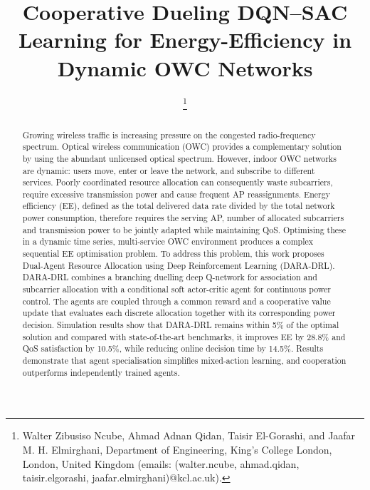 \documentclass[journal]{IEEEtran}
\begin{document}
\title{Cooperative Dueling DQN–SAC Learning for Energy-Efficiency in Dynamic OWC Networks
}

\author{

\thanks{Walter Zibusiso Ncube,
    Ahmad Adnan Qidan, Taisir El-Gorashi,
    and Jaafar M. H. Elmirghani, Department of Engineering, King’s College London, London, United Kingdom (emails: (walter.ncube, ahmad.qidan, taisir.elgorashi, jaafar.elmirghani)@kcl.ac.uk).}
}
\maketitle

\begin{abstract}
Growing wireless traffic is increasing pressure on the congested radio-frequency spectrum. Optical wireless communication (OWC) provides a complementary solution by using the abundant unlicensed optical spectrum. However, indoor OWC networks are dynamic: users move, enter or leave the network, and subscribe to different services. Poorly coordinated resource allocation can consequently waste subcarriers, require excessive transmission power and cause frequent AP reassignments. Energy efficiency (EE), defined as the total delivered data rate divided by the total network power consumption, therefore requires the serving AP, number of allocated subcarriers and transmission power to be jointly adapted while maintaining QoS. Optimising these in a dynamic time series, multi-service OWC environment produces a complex sequential EE optimisation problem. To address this problem, this work proposes Dual-Agent Resource Allocation using Deep Reinforcement Learning (DARA-DRL). DARA-DRL combines a branching duelling deep Q-network for association and subcarrier allocation with a conditional soft actor-critic agent for continuous power control. The agents are coupled through a common reward and a cooperative value update that evaluates each discrete allocation together with its corresponding power decision. Simulation results show that DARA-DRL remains within 5\% of the
optimal solution and compared with state-of-the-art benchmarks, it
improves EE by 28.8\% and
QoS satisfaction by 10.5\%, while reducing online decision
time by 14.5\%. Results demonstrate that agent specialisation simplifies mixed-action learning, and cooperation outperforms independently trained agents.
\end{abstract}
\end{document}
